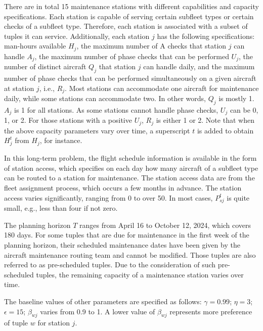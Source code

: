 There are in total 15 maintenance stations with different capabilities and capacity specifications. Each station is capable of serving certain subfleet types or certain checks of a subfleet type. Therefore, each station is associated with a subset of tuples it can service. Additionally, each station $j$ has the following specifications: man-hours available $H_j$, the maximum number of A checks that station $j$ can handle $A_j$, the maximum number of phase checks that can be performed $U_j$, the number of distinct aircraft $Q_j$ that station $j$ can handle daily, and the maximum number of phase checks that can be performed simultaneously on a given aircraft at station $j$, i.e., $R_j$. Most stations can accommodate one aircraft for maintenance daily, while some stations can accommodate two. In other words, $Q_j$ is mostly 1. $A_j$ is 1 for all stations. As some stations cannot handle phase checks, $U_j$ can be 0, 1, or 2. For those stations with a positive $U_j$, $R_j$ is either 1 or 2. Note that when the above capacity parameters vary over time, a superscript $t$ is added to obtain $H_j^t$ from $H_j$, for instance.


In this long-term problem, the flight schedule information is available in the form of station access, which specifies on each day how many aircraft of a subfleet type can be routed to a station for maintenance. The station access data are from the fleet assignment process, which occurs a few months in advance. The station access varies significantly, ranging from 0 to over 50. In most cases, $P_{sj}^t$ is quite small, e.g., less than four if not zero.


The planning horizon $T$ ranges from April 16 to October 12, 2024, which covers 180 days. For some tuples that are due for maintenance in the first week of the planning horizon, their scheduled maintenance dates have been given by the aircraft maintenance routing team and cannot be modified. Those tuples are also referred to as pre-scheduled tuples. Due to the consideration of such pre-scheduled tuples, the remaining capacity of a maintenance station varies over time.

The baseline values of other parameters are specified as follows: $\gamma = 0.99$; $\eta = 3$; $\epsilon = 15$; $\beta_{wj}$ varies from 0.9 to 1. A lower value of $\beta_{wj}$ represents more preference of tuple $w$ for station $j$.

